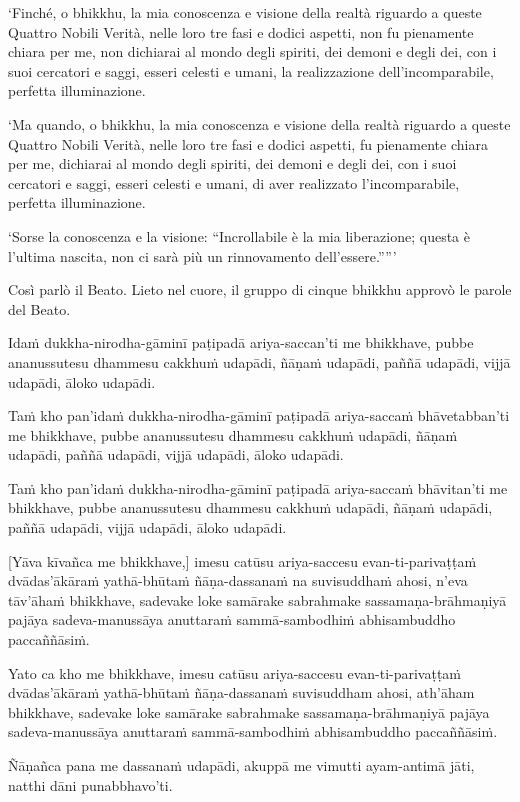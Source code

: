 ‘Finché, o bhikkhu, la mia conoscenza e visione della realtà riguardo
a queste Quattro Nobili Verità, nelle loro tre fasi e dodici aspetti, non
fu pienamente chiara per me, non dichiarai al mondo degli spiriti,
dei demoni e degli dei, con i suoi cercatori e saggi, esseri celesti e umani,
la realizzazione dell'incomparabile, perfetta illuminazione.

‘Ma quando, o bhikkhu, la mia conoscenza e visione della realtà riguardo a queste
Quattro Nobili Verità, nelle loro tre fasi e dodici aspetti, fu pienamente
chiara per me, dichiarai al mondo degli spiriti, dei demoni e degli dei, con
i suoi cercatori e saggi, esseri celesti e umani, di aver realizzato
l'incomparabile, perfetta illuminazione.


‘Sorse la conoscenza e la visione: “Incrollabile è la mia liberazione; questa è
l'ultima nascita, non ci sarà più un rinnovamento dell'essere.””\thinspace ’

Così parlò il Beato. Lieto nel cuore, il gruppo di cinque bhikkhu
approvò le parole del Beato.

\clearpage

\paliText
\markboth{\paliTitle}{\rightmark}

Idaṁ dukkha-nirodha-gāminī paṭipadā ariya-saccan'ti me bhikkhave, pubbe
ananussutesu dhammesu cakkhuṁ udapādi, ñāṇaṁ udapādi, paññā udapādi,
vijjā udapādi, āloko udapādi.

Taṁ kho pan'idaṁ dukkha-nirodha-gāminī paṭipadā ariya-saccaṁ bhāvetabban'ti
me bhikkhave, pubbe ananussutesu dhammesu cakkhuṁ udapādi, ñāṇaṁ
udapādi, paññā udapādi, vijjā udapādi, āloko udapādi.

Taṁ kho pan'idaṁ dukkha-nirodha-gāminī paṭipadā ariya-saccaṁ bhāvitan'ti me
bhikkhave, pubbe ananussutesu dhammesu cakkhuṁ udapādi, ñāṇaṁ udapādi,
paññā udapādi, vijjā udapādi, āloko udapādi.

[Yāva kīvañca me bhikkhave,] imesu catūsu ariya-saccesu evan-ti-parivaṭṭaṁ
dvādas'ākāraṁ yathā-bhūtaṁ ñāṇa-dassanaṁ na suvisuddhaṁ ahosi, n'eva tāv'āhaṁ
bhikkhave, sadevake loke samārake sabrahmake sassamaṇa-brāhmaṇiyā pajāya
sadeva-manussāya anuttaraṁ sammā-sambodhiṁ abhisambuddho paccaññāsiṁ.

Yato ca kho me bhikkhave, imesu catūsu ariya-saccesu evan-ti-parivaṭṭaṁ
dvādas'ākāraṁ yathā-bhūtaṁ ñāṇa-dassanaṁ suvisuddham ahosi, ath'āham
bhikkhave, sadevake loke samārake sabrahmake sassamaṇa-brāhmaṇiyā pajāya
sadeva-manussāya anuttaraṁ sammā-sambodhiṁ abhisambuddho paccaññāsiṁ.

Ñāṇañca pana me dassanaṁ udapādi, akuppā me vimutti ayam-antimā jāti,
natthi dāni punabbhavo'ti.


